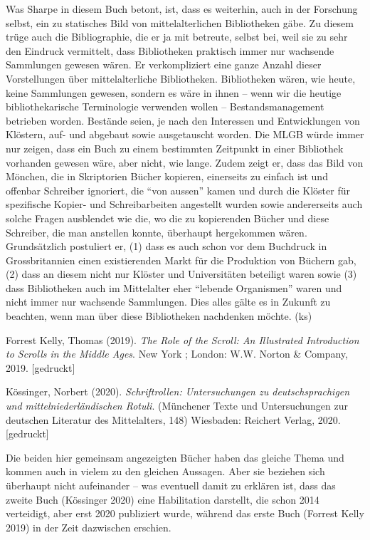\documentclass[a4paper,
fontsize=11pt,
oneside,
numbers=noperiodatend,
parskip=half-,
bibliography=totoc,
final
]{scrartcl}
\begin{document}
Was Sharpe in diesem Buch betont, ist, dass es weiterhin, auch in der
Forschung selbst, ein zu statisches Bild von mittelalterlichen
Bibliotheken gäbe. Zu diesem trüge auch die Bibliographie, die er ja mit
betreute, selbst bei, weil sie zu sehr den Eindruck vermittelt, dass
Bibliotheken praktisch immer nur wachsende Sammlungen gewesen wären. Er
verkompliziert eine ganze Anzahl dieser Vorstellungen über
mittelalterliche Bibliotheken. Bibliotheken wären, wie heute, keine
Sammlungen gewesen, sondern es wäre in ihnen -- wenn wir die heutige
bibliothekarische Terminologie verwenden wollen -- Bestandsmanagement
betrieben worden. Bestände seien, je nach den Interessen und
Entwicklungen von Klöstern, auf- und abgebaut sowie ausgetauscht worden.
Die MLGB würde immer nur zeigen, dass ein Buch zu einem bestimmten
Zeitpunkt in einer Bibliothek vorhanden gewesen wäre, aber nicht, wie
lange. Zudem zeigt er, dass das Bild von Mönchen, die in Skriptorien
Bücher kopieren, einerseits zu einfach ist und offenbar Schreiber
ignoriert, die \enquote{von aussen} kamen und durch die Klöster für
spezifische Kopier- und Schreibarbeiten angestellt wurden sowie
andererseits auch solche Fragen ausblendet wie die, wo die zu
kopierenden Bücher und diese Schreiber, die man anstellen konnte,
überhaupt hergekommen wären. Grundsätzlich postuliert er, (1) dass es
auch schon vor dem Buchdruck in Grossbritannien einen existierenden
Markt für die Produktion von Büchern gab, (2) dass an diesem nicht nur
Klöster und Universitäten beteiligt waren sowie (3) dass Bibliotheken
auch im Mittelalter eher \enquote{lebende Organismen} waren und nicht
immer nur wachsende Sammlungen. Dies alles gälte es in Zukunft zu
beachten, wenn man über diese Bibliotheken nachdenken möchte. (ks)

Forrest Kelly, Thomas (2019). \emph{The Role of the Scroll: An
Illustrated Introduction to Scrolls in the Middle Ages}. New York ;
London: W.W. Norton \& Company, 2019. {[}gedruckt{]}

Kössinger, Norbert (2020). \emph{Schriftrollen: Untersuchungen zu
deutschsprachigen und mittelniederländischen Rotuli}. (Münchener Texte
und Untersuchungen zur deutschen Literatur des Mittelalters, 148)
Wiesbaden: Reichert Verlag, 2020. {[}gedruckt{]}

Die beiden hier gemeinsam angezeigten Bücher haben das gleiche Thema und
kommen auch in vielem zu den gleichen Aussagen. Aber sie beziehen sich
überhaupt nicht aufeinander -- was eventuell damit zu erklären ist, dass
das zweite Buch (Kössinger 2020) eine Habilitation darstellt, die schon
2014 verteidigt, aber erst 2020 publiziert wurde, während das erste Buch
(Forrest Kelly 2019) in der Zeit dazwischen erschien.
\end{document}

